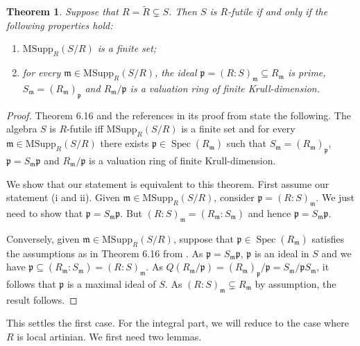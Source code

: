 \documentclass{amsart}
\theoremstyle{plain}
\newtheorem{theorem}{Theorem}[section]
\theoremstyle{definition}
\begin{document}
\begin{theorem} \label{901}
 Suppose that $R=\tilde{R} \subsetneq S$. Then $S$ is $R$-futile if and only if the following properties hold:
\begin{enumerate}
 \item $\mathrm{MSupp}_{R}(S/R)$ is a finite set;
 \item for every ${\mathfrak{m}} \in \mathrm{MSupp}_{R}(S/R)$, the ideal ${\mathfrak{p}}=(R:S)_{\mathfrak{m}} \subseteq R_{\mathfrak{m}} $ is prime, $S_{\mathfrak{m}}=(R_{\mathfrak{m}})_{\mathfrak{p}}$ and $R_{\mathfrak{m}}/{\mathfrak{p}}$ is
a valuation ring of finite Krull-dimension. 
\end{enumerate}
\end{theorem}
\begin{proof}
Theorem 6.16 and the references in its proof from \cite{DO5} state the following. The algebra $S$ is $R$-futile iff $\mathrm{MSupp}_{R}(S/R)$ is a
finite set and for every ${\mathfrak{m}} \in \mathrm{MSupp}_{R}(S/R)$ there exists ${\mathfrak{p}} \in \operatorname{Spec}(R_{\mathfrak{m}})$ such that $S_{\mathfrak{m}}=(R_{\mathfrak{m}})_{\mathfrak{p}}$, ${\mathfrak{p}}=S_{\mathfrak{m}} {\mathfrak{p}}$ and
$R_{\mathfrak{m}}/{\mathfrak{p}}$ is a valuation ring of finite Krull-dimension.

We show that our statement is equivalent to this theorem. First assume our statement (i and ii). Given ${\mathfrak{m}} \in \mathrm{MSupp}_{R}(S/R)$, consider
${\mathfrak{p}}=(R:S)_{\mathfrak{m}}$. We just need to show that ${\mathfrak{p}}=S_{\mathfrak{m}} {\mathfrak{p}}$. But $(R:S)_{\mathfrak{m}}=(R_{\mathfrak{m}}:S_{\mathfrak{m}})$ and hence ${\mathfrak{p}}=S_{\mathfrak{m}} {\mathfrak{p}}$.

Conversely, given ${\mathfrak{m}} \in \mathrm{MSupp}_{R}(S/R)$, suppose that ${\mathfrak{p}} \in \operatorname{Spec}(R_{\mathfrak{m}})$ satisfies the assumptions as in Theorem 6.16 from \cite{DO5}.
As ${\mathfrak{p}}=S_{\mathfrak{m}} {\mathfrak{p}}$, ${\mathfrak{p}}$ is an ideal in $S$ and we have ${\mathfrak{p}} \subseteq (R_{\mathfrak{m}}:S_{\mathfrak{m}})=(R:S)_{\mathfrak{m}}$. As
$Q(R_{\mathfrak{m}}/{\mathfrak{p}})=(R_{\mathfrak{m}})_{\mathfrak{p}}/{\mathfrak{p}}=S_{\mathfrak{m}}/{\mathfrak{p}} S_{\mathfrak{m}}$, it follows that ${\mathfrak{p}}$ is a maximal ideal of $S$. As $(R:S)_{\mathfrak{m}} \subsetneq R_{\mathfrak{m}}$ by
assumption, the result follows.
\end{proof}

This settles the first case. For the integral part, we will reduce to the case where $R$ is local artinian. We first need
two lemmas.
\end{document}
